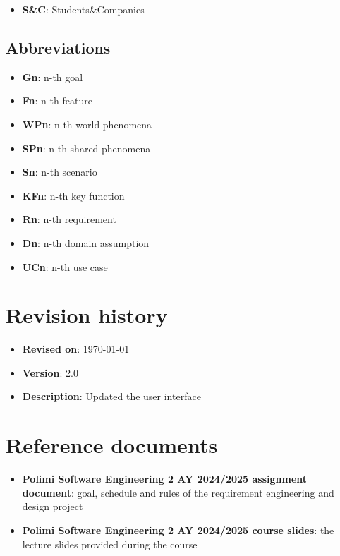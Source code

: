 \begin{itemize}
    \item \textbf{S\&C}: Students\&Companies
\end{itemize}

\subsection{Abbreviations}

\begin{itemize}
    \item \textbf{Gn}: n-th goal
    \item \textbf{Fn}: n-th feature
    \item \textbf{WPn}: n-th world phenomena
    \item \textbf{SPn}: n-th shared phenomena
    \item \textbf{Sn}: n-th scenario
    \item \textbf{KFn}: n-th key function
    \item \textbf{Rn}: n-th requirement
    \item \textbf{Dn}: n-th domain assumption
    \item \textbf{UCn}: n-th use case
\end{itemize}

\section{Revision history}

\begin{itemize}
    \item \textbf{Revised on}: \today
    \item \textbf{Version}: 2.0
    \item \textbf{Description}: Updated the user interface
\end{itemize}

\section{Reference documents}

\begin{itemize}
    \item \textbf{Polimi Software Engineering 2 AY 2024/2025 assignment document}: goal, schedule and rules of the requirement engineering and design project
    \item \textbf{Polimi Software Engineering 2 AY 2024/2025 course slides}: the lecture slides provided during the course
\end{itemize}


